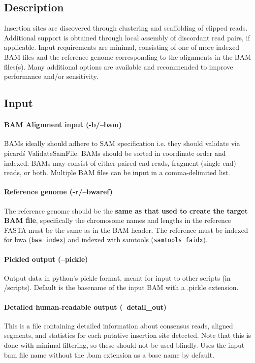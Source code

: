 \documentclass[letterpaper,11pt]{article}
\begin{document}
\subsection{Description}
Insertion sites are discovered through clustering and scaffolding of clipped reads. Additional support is obtained through local assembly of discordant read pairs, if applicable. Input requirements are minimal, consisting of one of more indexed BAM files and the reference genome corresponding to the alignments in the BAM files(s). Many additional options are available and recommended to improve performance and/or sensitivity.

\subsection{Input}
\paragraph{BAM Alignment input (-b/--bam)}
	BAMs ideally should adhere to SAM specification i.e. they should validate via picard\'s ValidateSamFile. BAMs should be sorted in coordinate order and indexed. BAMs may consist of either paired-end reads, fragment (single end) reads, or both. Multiple BAM files can be input in a comma-delimited list.
	
\paragraph{Reference genome (-r/--bwaref)}
	The reference genome should be the \textbf{same as that used to create the target BAM file}, specifically the chromosome names and lengths in the reference FASTA must be the same as in the BAM header. The reference must be indexed for bwa (\texttt{bwa index}) and indexed with samtools (\texttt{samtools faidx}).

\paragraph{Pickled output (--pickle)}
Output data in python's pickle format, meant for input to other scripts  (in /scripts). Default is the basename of the input BAM with a .pickle extension.

\paragraph{Detailed human-readable output (--detail\_out)}
This is a file containing detailed information about consensus reads, aligned segments, and statistics for each putative insertion site detected. Note that this is done with minimal filtering, so these should not be used blindly. Uses the input bam file name without the .bam extension as a base name by default.
\end{document}
